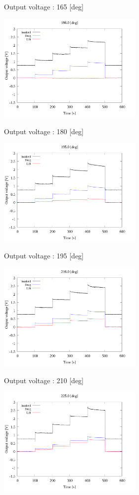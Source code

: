 \begin{multicols}{2}
\begin{figure_here}
\begin{center}
            \caption{Output voltage : 165 [deg]}
            \includegraphics[width=70mm]{../../02_workspace/result/2-1/plot/01-3_allsensors/01_allsensors_1800.png}
            \caption{Output voltage : 180 [deg]}
            \includegraphics[width=70mm]{../../02_workspace/result/2-1/plot/01-3_allsensors/01_allsensors_1950.png}
            \caption{Output voltage : 195 [deg]}
            \includegraphics[width=70mm]{../../02_workspace/result/2-1/plot/01-3_allsensors/01_allsensors_2100.png}
            \caption{Output voltage : 210 [deg]}
            \includegraphics[width=70mm]{../../02_workspace/result/2-1/plot/01-3_allsensors/01_allsensors_2250.png}

\end{center}
\end{figure_here}
\end{multicols}
